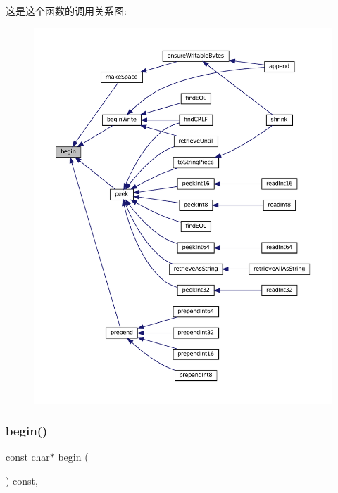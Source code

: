 这是这个函数的调用关系图\+:
\nopagebreak
\begin{figure}[H]
\begin{center}
\leavevmode
\includegraphics[width=350pt]{classmuduo_1_1net_1_1Buffer_ad431daee7daddf53f8aca682ddf3c940_icgraph}
\end{center}
\end{figure}
\mbox{\label{classmuduo_1_1net_1_1Buffer_a5386e98f71cb440232f0c41041f50af4}} 
\subsubsection{\texorpdfstring{begin()}{begin()}\hspace{0.1cm}{\footnotesize\ttfamily [2/2]}}
{\footnotesize\ttfamily const char$\ast$ begin (\begin{DoxyParamCaption}{ }\end{DoxyParamCaption}) const\hspace{0.3cm}{\ttfamily [inline]}, {\ttfamily [private]}}



